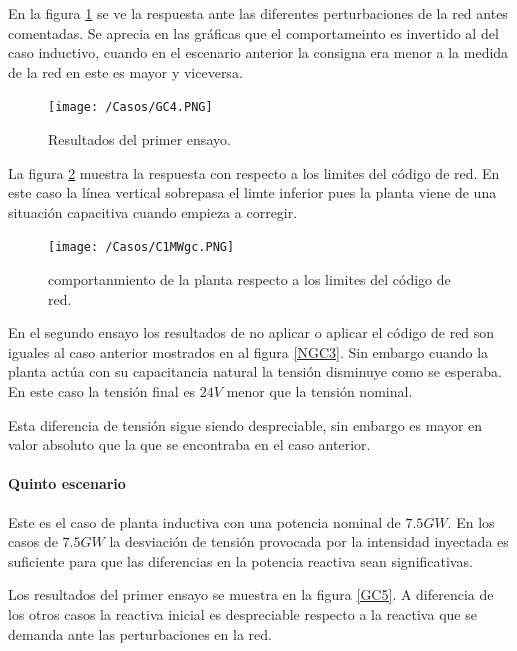 \documentclass{book}
\begin{document}
En la figura \ref{GC4} se ve la respuesta ante las diferentes perturbaciones de la red antes comentadas. Se aprecia en las gr\'aficas que el comportameinto es invertido al del caso inductivo, cuando en el escenario anterior la consigna era menor a la medida de la red en este es mayor y viceversa. \par

\begin{figure}[h!]
\centering
\texttt{[image: /Casos/GC4.PNG]}
\caption{Resultados del primer ensayo. }
\label{GC4}
\end{figure} \par

La figura \ref{C1MWgc} muestra la respuesta con respecto a los limites del c\'odigo de red. En este caso la l\'inea vertical sobrepasa el limte inferior pues la planta viene de una situaci\'on capacitiva cuando empieza a corregir. \par

\begin{figure}[h!]
\centering
\texttt{[image: /Casos/C1MWgc.PNG]}
\caption{comportanmiento de la planta respecto a los limites del c\'odigo de red. }
\label{C1MWgc}
\end{figure} \par

En el segundo ensayo los resultados de no aplicar o aplicar el c\'odigo de red son iguales al caso anterior mostrados en al figura \ref{NGC3}. Sin embargo cuando la planta act\'ua con su capacitancia natural la tensi\'on disminuye como se esperaba. En este caso la tensi\'on final es $24V$ menor que la tensi\'on nominal. \par

Esta diferencia de tensi\'on sigue siendo despreciable, sin embargo es mayor en valor absoluto que la que se encontraba en el caso anterior. \par 

	\paragraph{Quinto escenario}

Este es el caso de planta inductiva con una potencia nominal de $7.5GW$. En los casos de $7.5GW$ la desviaci\'on de tensi\'on provocada por la intensidad inyectada es suficiente para que las diferencias en la potencia reactiva sean significativas. \par

Los resultados del primer ensayo se muestra en la figura \ref{GC5}. A diferencia de los otros casos la reactiva inicial es despreciable respecto a la reactiva que se demanda ante las perturbaciones en la red. \par
\end{document}
